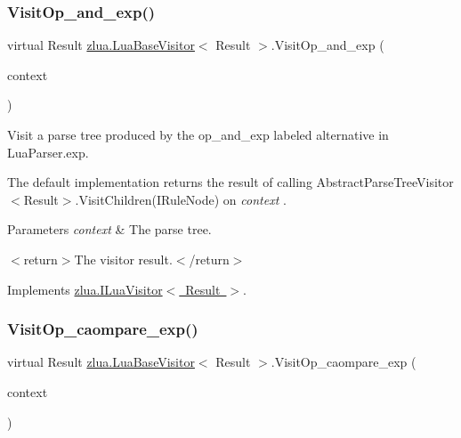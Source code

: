 \subsubsection{\texorpdfstring{Visit\+Op\+\_\+and\+\_\+exp()}{VisitOp\_and\_exp()}}
{\footnotesize\ttfamily virtual Result \mbox{\hyperlink{classzlua_1_1_lua_base_visitor}{zlua.\+Lua\+Base\+Visitor}}$<$ Result $>$.Visit\+Op\+\_\+and\+\_\+exp (\begin{DoxyParamCaption}\item[{\mbox{[}\+Not\+Null\mbox{]} \mbox{\hyperlink{classzlua_1_1_lua_parser_1_1_op__and__exp_context}{Lua\+Parser.\+Op\+\_\+and\+\_\+exp\+Context}}}]{context }\end{DoxyParamCaption})\hspace{0.3cm}{\ttfamily [virtual]}}



Visit a parse tree produced by the {\ttfamily op\+\_\+and\+\_\+exp} labeled alternative in Lua\+Parser.\+exp. 

The default implementation returns the result of calling Abstract\+Parse\+Tree\+Visitor$<$\+Result$>$.\+Visit\+Children(\+I\+Rule\+Node) on {\itshape context} . 


\begin{DoxyParams}{Parameters}
{\em context} & The parse tree.\\
\hline
\end{DoxyParams}
$<$return$>$The visitor result.$<$/return$>$ 

Implements \mbox{\hyperlink{interfacezlua_1_1_i_lua_visitor_a08fb69b4fbc6ffe769818deeb1891307}{zlua.\+I\+Lua\+Visitor$<$ Result $>$}}.

\mbox{\label{classzlua_1_1_lua_base_visitor_aff0d9ab4eaa061d503aa4f0b644551e6}} 
\subsubsection{\texorpdfstring{Visit\+Op\+\_\+caompare\+\_\+exp()}{VisitOp\_caompare\_exp()}}
{\footnotesize\ttfamily virtual Result \mbox{\hyperlink{classzlua_1_1_lua_base_visitor}{zlua.\+Lua\+Base\+Visitor}}$<$ Result $>$.Visit\+Op\+\_\+caompare\+\_\+exp (\begin{DoxyParamCaption}\item[{\mbox{[}\+Not\+Null\mbox{]} \mbox{\hyperlink{classzlua_1_1_lua_parser_1_1_op__caompare__exp_context}{Lua\+Parser.\+Op\+\_\+caompare\+\_\+exp\+Context}}}]{context }\end{DoxyParamCaption})\hspace{0.3cm}{\ttfamily [virtual]}}



